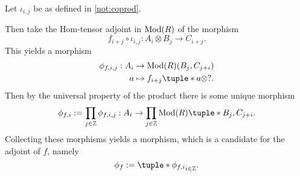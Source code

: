 \begin{remark}
\begin{center}
    \end{center}

    Let \( \iota_{i, j} \) be as defined in \autoref{not:coprod}.

    Then take the Hom-tensor adjoint in \( \operatorname{Mod}(R) \) of the morphism
    \[
        f_{i + j} \circ \iota_{i, j}: A_i \otimes B_j \to C_{i + j}.
    \]
    This yields a morphism
    \begin{align*}
        \phi_{f, i, j}: A_i &\to \Mod(R)(B_j, C_{j + i}) \\
        a &\mapsto f_{i + j}\tuple*{ a \otimes ? }.
    \end{align*}
    Then by the universal property of the product there is some unique morphism
    \[
        \phi_{f, i} := \prod_{j \in \Zb} \phi_{f, i, j}: A_i \to \prod_{j \in \Zb} \Mod(R)\tuple*{B_j, C_{j + i}}.
    \]
    Collecting these morphisms yields a morphism, which is a candidate for the adjoint of \( f \), namely
    \[
        \phi_f := \tuple*{\phi_{f, i}}_{i \in \Zb}.
    \]
\end{remark}

